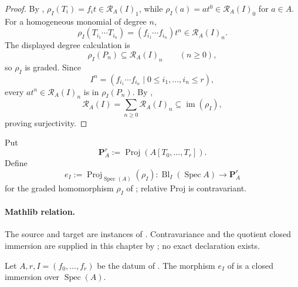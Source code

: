 \begin{proof}
  By ,
  $\rho_I(T_i)=f_it\in\mathcal R_A(I)_1$, while
  $\rho_I(a)=at^0\in\mathcal R_A(I)_0$ for $a\in A$.  For a homogeneous
  monomial of degree $n$,
  \[
    \rho_I(T_{i_1}\cdots T_{i_n})
      =(f_{i_1}\cdots f_{i_n})t^n\in\mathcal R_A(I)_n.
  \]
  The displayed degree calculation is
  \[
    \rho_I(P_n)\subseteq\mathcal R_A(I)_n\qquad(n\geq0),
  \]
  so $\rho_I$ is graded.  Since
  \[
    I^n=(f_{i_1}\cdots f_{i_n}\mid
      0\le i_1,\ldots,i_n\le r),
  \]
  every $at^n\in\mathcal R_A(I)_n$ is in $\rho_I(P_n)$.  By
  ,
  \[
    \mathcal R_A(I)=\sum_{n\ge0}\mathcal R_A(I)_n
      \subseteq\operatorname{im}(\rho_I),
  \]
  proving surjectivity.
\end{proof}

\begin{definition}
  \label{def:nagata-affine-blowup-projective-embedding}

  Put
  \[
    \mathbf P_A^r:=\operatorname{Proj}(A[T_0,\ldots,T_r]).
  \]
  Define
  \[
    e_I:=\operatorname{Proj}_{\operatorname{Spec}(A)}(\rho_I)
      \colon\operatorname{Bl}_I(\operatorname{Spec}A)
      \longrightarrow\mathbf P^r_A
  \]
  for the graded homomorphism $\rho_I$ of
  ; relative Proj is contravariant.

  \paragraph{Mathlib relation.}
  The source and target are instances of
  \texttt{}.  Contravariance and the
  quotient closed immersion are supplied in this chapter by
  ; no exact
  \texttt{} declaration exists.
\end{definition}

\begin{lemma}
  \label{lemma:nagata-affine-blowup-projective-embedding}

  Let $A,r,I=(f_0,\ldots,f_r)$ be the datum of
  .
  The morphism $e_I$ of
   is a closed immersion
  over
  $\operatorname{Spec}(A)$.
\end{lemma}

